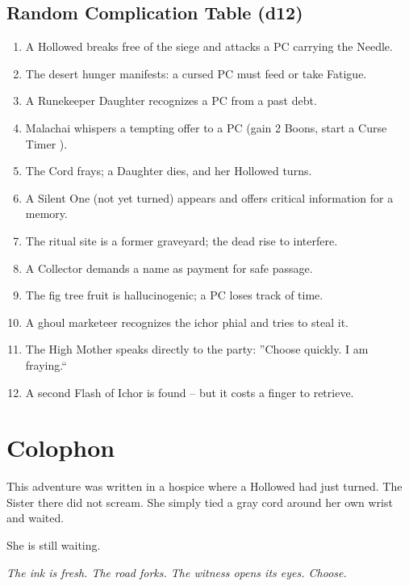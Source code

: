 \documentclass[10pt,twoside]{book}
\begin{document}
\section{Random Complication Table (d12)}
\begin{enumerate}
\item A Hollowed breaks free of the siege and attacks a PC carrying the Needle.
\item The desert hunger manifests: a cursed PC must feed or take Fatigue.
\item A Runekeeper Daughter recognizes a PC from a past debt.
\item Malachai whispers a tempting offer to a PC (gain 2 Boons, start a Curse Timer ).
\item The Cord frays; a Daughter dies, and her Hollowed turns.
\item A Silent One (not yet turned) appears and offers critical information for a memory.
\item The ritual site is a former graveyard; the dead rise to interfere.
\item A Collector demands a name as payment for safe passage.
\item The fig tree fruit is hallucinogenic; a PC loses track of time.
\item A ghoul marketeer recognizes the ichor phial and tries to steal it.
\item The High Mother speaks directly to the party: ''Choose quickly. I am fraying.``
\item A second Flash of Ichor is found -- but it costs a finger to retrieve.
\end{enumerate}

\chapter{Colophon}
This adventure was written in a hospice where a Hollowed had just turned. The Sister there did not scream. She simply tied a gray cord around her own wrist and waited.

She is still waiting.

\vspace{0.5cm}
\noindent
\textit{The ink is fresh. The road forks. The witness opens its eyes. Choose.}
\end{document}
